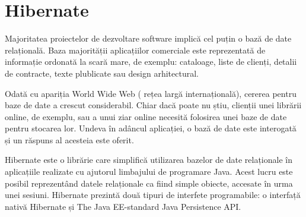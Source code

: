 \documentclass[12pt]{book}
\begin{document}
\section{Hibernate}
Majoritatea proiectelor de dezvoltare software implică cel puțin o bază de date relațională. Baza majorității aplicațiilor comerciale este reprezentată de informație ordonată la scară mare, de exemplu: cataloage, liste de clienți, detalii de contracte, texte plublicate sau design arhitectural.

Odată cu apariția World Wide Web ( rețea largă internațională), cererea pentru baze de date a crescut considerabil. Chiar dacă poate nu știu, clienții unei librării online, de exemplu, sau a unui ziar online necesită folosirea unei baze de date pentru stocarea lor. Undeva în adâncul aplicației, o bază de date este interogată și un răspuns al acesteia este oferit. 

Hibernate este o librărie care simplifică utilizarea bazelor de date relaționale în aplicațiile realizate cu ajutorul limbajului de programare Java. Acest lucru este posibil reprezentând datele relaționale ca fiind simple obiecte, accesate în urma unei sesiuni. Hibernate prezintă două tipuri de interfete programabile: o interfață nativă Hibernate și The Java EE-standard Java Persistence API. 
\end{document}
